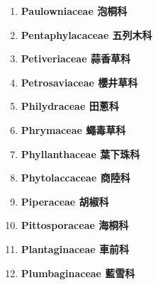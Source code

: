 \begin{enumerate}
        
      \item[] \begin{small}\textbf{Paulowniaceae 泡桐科} \end{small}
        
      \item[] \begin{small}\textbf{Pentaphylacaceae 五列木科} \end{small}
        
      \item[] \begin{small}\textbf{Petiveriaceae 蒜香草科} \end{small}
        
      \item[] \begin{small}\textbf{Petrosaviaceae 櫻井草科} \end{small}
        
      \item[] \begin{small}\textbf{Philydraceae 田蔥科} \end{small}
        
      \item[] \begin{small}\textbf{Phrymaceae 蠅毒草科} \end{small}
        
      \item[] \begin{small}\textbf{Phyllanthaceae 葉下珠科} \end{small}
        
      \item[] \begin{small}\textbf{Phytolaccaceae 商陸科} \end{small}
        
      \item[] \begin{small}\textbf{Piperaceae 胡椒科} \end{small}
        
      \item[] \begin{small}\textbf{Pittosporaceae 海桐科} \end{small}
        
      \item[] \begin{small}\textbf{Plantaginaceae 車前科} \end{small}
        
      \item[] \begin{small}\textbf{Plumbaginaceae 藍雪科} \end{small}

\end{enumerate}
